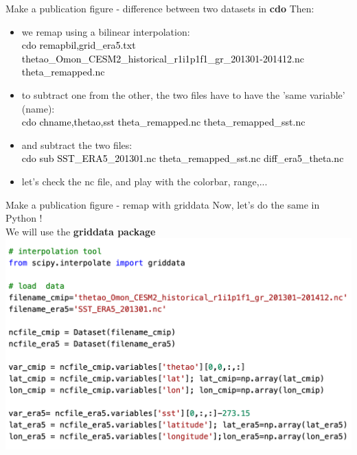   
\begin{frame}{\insertsectionnumber{ |} Make a publication figure - difference between two datasets in \textbf{cdo}} 
    Then: 
        \begin{itemize}
            \item we remap using a bilinear interpolation: \\
                \textcolor{black}{cdo remapbil,grid\_era5.txt thetao\_Omon\_CESM2\_historical\_r1i1p1f1\_gr\_201301-201412.nc theta\_remapped.nc}
                    \vspace{0.3cm}
            \item  to subtract one from the other, the two files have to have the 'same variable' (name):\\
                \textcolor{black}{cdo chname,thetao,sst theta\_remapped.nc theta\_remapped\_sst.nc} \\
                    \vspace{0.3cm}
            \item and subtract the two files:\\
                \textcolor{black}{cdo sub SST\_ERA5\_201301.nc theta\_remapped\_sst.nc diff\_era5\_theta.nc} \\
                    \vspace{0.3cm} 
            \item let's check the nc file, and play with the colorbar, range,...
        \end{itemize}
\end{frame}

  
\begin{frame}{\insertsectionnumber{ |} Make a publication figure - remap with griddata} 
    Now, let's do the same in Python !\\
        \vspace{0.3cm} 
    We will use the \textbf{griddata package}\\
    \includegraphics[scale=0.35]{images/Script5_step1.png}
\end{frame}


